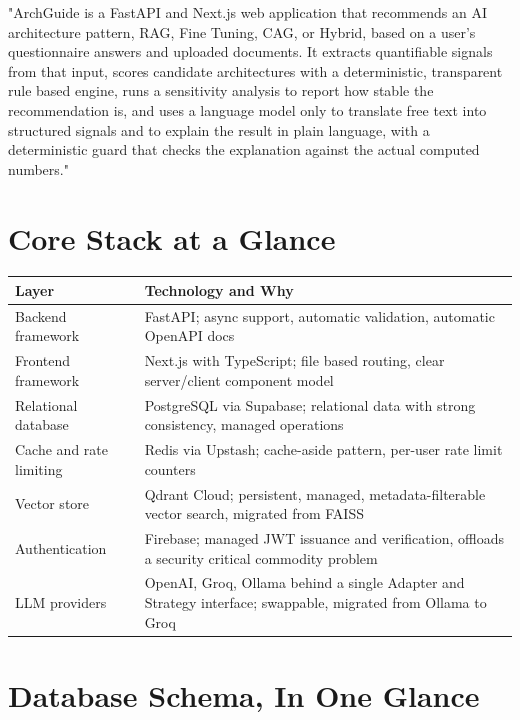 \documentclass[11pt,a4paper]{report}
\begin{document}
\begin{notebox}
"ArchGuide is a FastAPI and Next.js web application that recommends an AI architecture pattern, RAG, Fine Tuning, CAG, or Hybrid, based on a user's questionnaire answers and uploaded documents. It extracts quantifiable signals from that input, scores candidate architectures with a deterministic, transparent rule based engine, runs a sensitivity analysis to report how stable the recommendation is, and uses a language model only to translate free text into structured signals and to explain the result in plain language, with a deterministic guard that checks the explanation against the actual computed numbers."
\end{notebox}

\section{Core Stack at a Glance}

\begin{center}
\begin{longtable}{p{4cm}p{9cm}}
\toprule
\textbf{Layer} & \textbf{Technology and Why} \\
\midrule
\endhead
Backend framework & FastAPI; async support, automatic validation, automatic OpenAPI docs \\
Frontend framework & Next.js with TypeScript; file based routing, clear server/client component model \\
Relational database & PostgreSQL via Supabase; relational data with strong consistency, managed operations \\
Cache and rate limiting & Redis via Upstash; cache-aside pattern, per-user rate limit counters \\
Vector store & Qdrant Cloud; persistent, managed, metadata-filterable vector search, migrated from FAISS \\
Authentication & Firebase; managed JWT issuance and verification, offloads a security critical commodity problem \\
LLM providers & OpenAI, Groq, Ollama behind a single Adapter and Strategy interface; swappable, migrated from Ollama to Groq \\
\bottomrule
\end{longtable}
\end{center}

\section{Database Schema, In One Glance}
\end{document}
